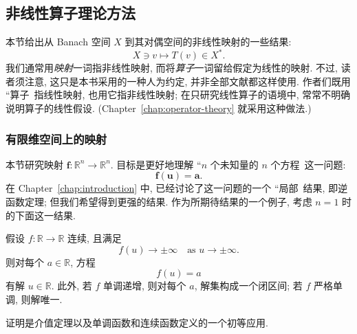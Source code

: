 \subsection{非线性算子理论方法}\label{sec:nonlinear-operator-theory-methods}

本节给出从 Banach 空间 $X$ 到其对偶空间的非线性映射的一些结果:
\begin{equation}\label{eq:nonlinear-banach-to-dual-mapping}
X\ni v\mapsto T(v)\in X^*.
\end{equation}
我们通常用\emph{映射}一词指非线性映射, 而将\emph{算子}一词留给假定为线性的映射. 不过, 读者须注意, 这只是本书采用的一种人为约定, 并非全部文献都这样使用. 作者们既用 ``算子\textquotesingle\textquotesingle\ 指线性映射, 也用它指非线性映射; 在只研究线性算子的语境中, 常常不明确说明算子的线性假设. (Chapter~\ref{chap:operator-theory} 就采用这种做法.)

\subsubsection{有限维空间上的映射}\label{subsec:finite-dimensional-nonlinear-mappings}

本节研究映射 $\bm{f}:\mathbb{R}^n\to\mathbb{R}^n$. 目标是更好地理解 ``$n$ 个未知量的 $n$ 个方程\textquotesingle\textquotesingle\ 这一问题:
\begin{equation}\label{eq:finite-dimensional-nonlinear-system}
\bm{f}(\bm{u})=\bm{a}.
\end{equation}
在 Chapter~\ref{chap:introduction} 中, 已经讨论了这一问题的一个 ``局部\textquotesingle\textquotesingle\ 结果, 即逆函数定理; 但我们希望得到更强的结果. 作为所期待结果的一个例子, 考虑 $n=1$ 时的下面这一结果.

\begin{Theorem}
\label{thm:scalar-continuous-monotone-surjectivity}
假设 $f:\mathbb{R}\to\mathbb{R}$ 连续, 且满足
\begin{equation}\label{eq:scalar-continuous-surjectivity-growth-condition}
f(u)\to\pm\infty\quad\text{as }u\to\pm\infty.
\end{equation}
则对每个 $a\in\mathbb{R}$, 方程
\begin{equation}\label{eq:scalar-continuous-surjectivity-equation}
f(u)=a
\end{equation}
有解 $u\in\mathbb{R}$. 此外, 若 $f$ 单调递增, 则对每个 $a$, 解集构成一个闭区间; 若 $f$ 严格单调, 则解唯一.
\end{Theorem}

证明是介值定理以及单调函数和连续函数定义的一个初等应用.

